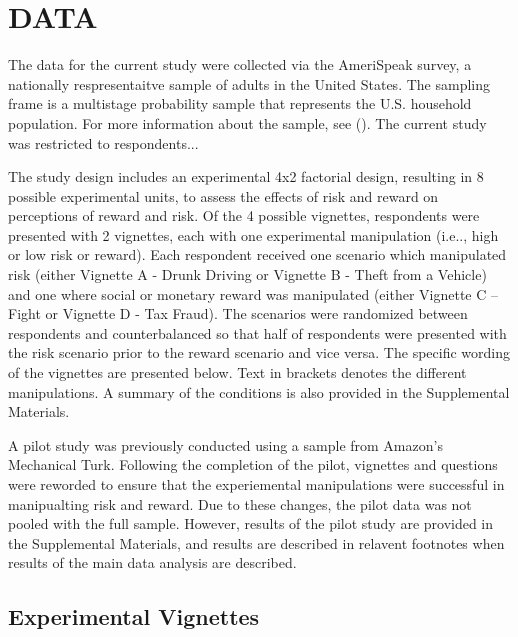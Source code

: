 \documentclass{article} %
\begin{document}
\section{DATA}

The data for the current study were collected via the AmeriSpeak survey, a nationally respresentaitve sample of adults in the United States. The sampling frame is a multistage probability sample that represents the U.S. household population. For more information about the sample, see (). The current study was restricted to respondents... 





The study design includes an experimental 4x2 factorial design, resulting in 8 possible experimental units, to assess the effects of risk and reward on perceptions of reward and risk. Of the 4 possible vignettes, respondents were presented with 2 vignettes, each with one experimental manipulation (i.e.., high or low risk or reward). Each respondent received one scenario which manipulated risk (either Vignette A - Drunk Driving or Vignette B - Theft from a Vehicle) and one where social or monetary reward was manipulated (either Vignette C – Fight or Vignette D - Tax Fraud). The scenarios were randomized between respondents and counterbalanced so that half of respondents were presented with the risk scenario prior to the reward scenario and vice versa. The specific wording of the vignettes are presented below. Text in brackets denotes the different manipulations. A summary of the conditions is also provided in the Supplemental Materials.

A pilot study was previously conducted using a sample from Amazon's Mechanical Turk. Following the completion of the pilot, vignettes and questions were reworded to ensure that the experiemental manipulations were successful in manipualting risk and reward. Due to these changes, the pilot data was not pooled with the full sample. However, results of the pilot study are provided in the Supplemental Materials, and results are described in relavent footnotes when results of the main data analysis are described.

\subsection{Experimental Vignettes}
\end{document}
